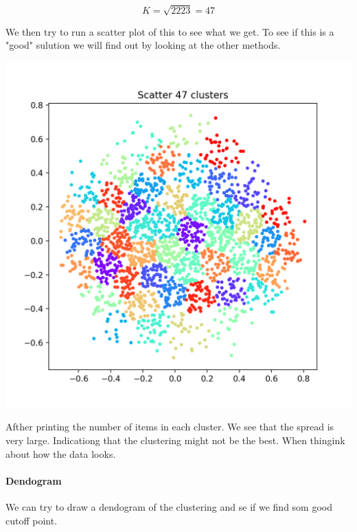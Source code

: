 \documentclass[10pt]{article}
\begin{document}
    \[K = \sqrt{2223} = 47\]

    We then try to run a scatter plot of this to see what we get. To see if this is a "good" sulution we will find out by looking at the other methods.

    \begin{center}
        \includegraphics[scale=0.5]{scatter_47.png}
    \end{center}

    Afther printing the number of items in each cluster. We see that the spread is very large. Indicationg that the clustering might not be the best. When thingink about how the data looks. 

    \paragraph{Dendogram}
    We can try to draw a dendogram of the clustering and se if we find som good cutoff point.
\end{document}
